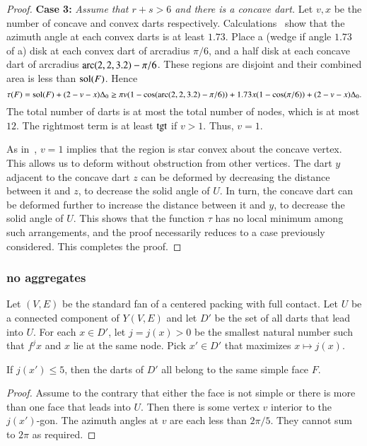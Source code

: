 \begin{proof}
{\bf Case 3:}
{\it Assume that $r+s>6$ and there is a concave dart.}  Let $v,x$ be the number of concave and convex darts respectively.  Calculations~\cite[cc:lft]{hales:2009:nonlinear} show that the azimuth angle at each convex darts is at least $1.73$.  Place a (wedge if angle $1.73$ of a) disk at each convex dart of arcradius $\pi/6$, and a half disk at each concave dart of arcradius $\operatorname{arc}(2,2,3.2)-\pi/6$.  These regions are disjoint and their combined area is less than $\operatorname{sol}(F)$.  Hence
$$
\tau(F)=\operatorname{sol}(F)+(2-v-x)\Delta_0 \ge \pi v (1-\cos(\operatorname{arc}(2,2,3.2)-\pi/6)) + 1.73 x (1-\cos(\pi/6)) + (2-v-x)\Delta_0.
$$
The total number of darts is at most the total number of nodes, which is at most $12$.  The rightmost term is at least ${\operatorname{tgt}}$ if $v> 1$. Thus, $v=1$.

As in~\cite{Hales:2006:DCG}, $v=1$ implies that the region is star convex about the concave vertex.  This allows us to deform without obstruction from other vertices.  The dart $y$ adjacent to the concave dart $z$ can be deformed by decreasing the distance between it and $z$, to decrease the solid angle of $U$.  In turn, the concave dart can be deformed further to increase the distance between it and $y$, to decrease the solid angle of $U$.  This shows that the function $\tau$ has no local minimum among such arrangements, and the proof necessarily reduces to a case previously considered.  This completes the proof.
\end{proof}

\subsubsection{no aggregates}

Let $(V,E)$ be the standard fan of a centered packing with full contact.  Let $U$ be a connected component of $Y(V,E)$ and let $D'$ be the set of all darts that lead into $U$.  For each $x\in D'$, let $j = j(x) >0$ be the smallest natural number such that $f^j x$ and $x$ lie at the same node.  Pick $x'\in D'$ that maximizes $x\mapsto j(x)$.  

\begin{lemma}\label{lemma:DU}  If $j(x')\le 5$, then the darts of $D'$ all belong to the same simple face $F$.
\end{lemma}

\begin{proof} Assume to the contrary that either the face is not simple or there is more than one face that leads into $U$.  Then there is some vertex $v$ interior to the $j(x')$-gon.  The azimuth angles at $v$ are each less than $2\pi/5$. They cannot sum to $2\pi$ as required.
\end{proof}

